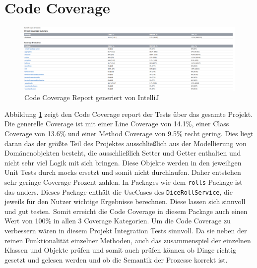 \section{Code Coverage}
\begin{figure}[H]
	\centering
	\includegraphics[width=\textwidth]{Bilder/CodeCoverage.pdf}
	\caption{Code Coverage Report generiert von IntelliJ}
	\label{fig:CodeCoverage}
\end{figure}
Abbildung \ref{fig:CodeCoverage} zeigt den Code Coverage report der Tests über das gesamte Projekt. Die generelle Coverage ist mit einer Line Coverage von 14.1\%, einer Class Coverage von 13.6\% und einer Method Coverage von 9.5\% recht gering. Dies liegt daran das der größte Teil des Projektes ausschließlich aus der Modellierung von Domänenobjekten besteht, die ausschließlich Setter und Getter enthalten und nicht sehr viel Logik mit sich bringen. Diese Objekte werden in den jeweiligen Unit Tests durch mocks ersetzt und somit nicht durchlaufen. Daher entstehen sehr geringe Coverage Prozent zahlen. In Packages wie dem \texttt{rolls} Package ist das anders. Dieses Package enthält die UseCases des \texttt{DiceRollService}, die jeweils für den Nutzer wichtige Ergebnisse berechnen. Diese lassen sich sinnvoll und gut testen. Somit erreicht die Code Coverage in diesem Package auch einen Wert von 100\% in allen 3 Coverage Kategorien. Um die Code Coverage zu verbessern wären in diesem Projekt Integration Tests sinnvoll. Da sie neben der reinen Funktionalität einzelner Methoden, auch das zusammenspiel der einzelnen Klassen und Objekte prüfen und somit auch prüfen können ob Dinge richtig gesetzt und gelesen werden und ob die Semantik der Prozesse korrekt ist.

